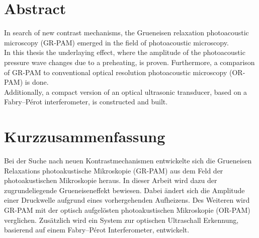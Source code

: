 \section*{}
\newpage
\thispagestyle{empty}
\section*{Abstract}

In search of new contrast mechanisms, the Grueneisen relaxation photoacoustic microscopy (GR-PAM) emerged in the field of photoacoustic microscopy. \\
In this thesis the underlaying effect, where the amplitude of the photoacoustic pressure wave changes due to a preheating, is proven. Furthermore, a comparison of GR-PAM to conventional optical resolution photoacoustic microscopy (OR-PAM) is done. \\
Additionally, a compact version of an optical ultrasonic transducer, based on a Fabry–P\'{e}rot interferometer, is constructed and built.\\

\section*{Kurzzusammenfassung}

Bei der Suche nach neuen Kontrastmechanismen entwickelte sich die Grueneisen Relaxations photoakustische Mikroskopie (GR-PAM) aus dem Feld der photoakustischen Mikroskopie heraus.
In dieser Arbeit wird dazu der zugrundeliegende Grueneiseneffekt bewiesen. Dabei ändert sich die Amplitude einer Druckwelle aufgrund eines vorhergehenden Aufheizens. Des Weiteren wird GR-PAM mit der optisch aufgelösten photoakustischen Mikroskopie (OR-PAM) verglichen. 
Zusätzlich wird ein System zur optischen Ultraschall Erkennung, basierend auf einem Fabry–P\'{e}rot Interferometer, entwickelt.  

\newpage
\thispagestyle{empty}
\section*{}


